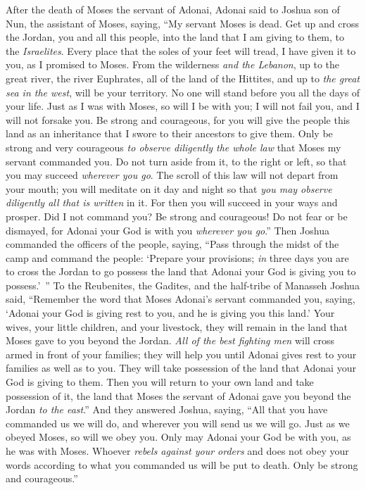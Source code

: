 
\begin{biblechapter} %
 After the death of Moses the servant of Adonai, Adonai said to Joshua son of Nun, the assistant of Moses, saying,
\verse “My servant Moses is dead. Get up and cross the Jordan, you and all this people, into the land that I am giving to them, to the \textit{Israelites}.
\verse Every place that the soles of your feet will tread, I have given it to you, as I promised to Moses.
\verse From the wilderness \textit{and the Lebanon}, up to the great river, the river Euphrates, all of the land of the Hittites, and up to \textit{the great sea in the west}, will be your territory.
\verse No one will stand before you all the days of your life. Just as I was with Moses, so will I be with you; I will not fail you, and I will not forsake you.
\verse Be strong and courageous, for you will give the people this land as an inheritance that I swore to their ancestors to give them.
\verse Only be strong and very courageous \textit{to observe diligently the whole law} that Moses my servant commanded you. Do not turn aside from it, to the right or left, so that you may succeed \textit{wherever you go}.
\verse The scroll of this law will not depart from your mouth; you will meditate on it day and night so that \textit{you may observe diligently all that is written} in it. For then you will succeed in your ways and prosper.
\verse Did I not command you? Be strong and courageous! Do not fear or be dismayed, for Adonai your God is with you \textit{wherever you go}.”
\verse Then Joshua commanded the officers of the people, saying,
\verse “Pass through the midst of the camp and command the people: ‘Prepare your provisions; \textit{in} three days you are to cross the Jordan to go possess the land that Adonai your God is giving you to possess.’ ”
\verse To the Reubenites, the Gadites, and the half-tribe of Manasseh Joshua said,
\verse “Remember the word that Moses Adonai’s servant commanded you, saying, ‘Adonai your God is giving rest to you, and he is giving you this land.’
\verse Your wives, your little children, and your livestock, they will remain in the land that Moses gave to you beyond the Jordan. \textit{All of the best fighting men} will cross armed in front of your families; they will help you
\verse until Adonai gives rest to your families as well as to you. They will take possession of the land that Adonai your God is giving to them. Then you will return to your own land and take possession of it, the land that Moses the servant of Adonai gave you beyond the Jordan \textit{to the east}.”
\verse And they answered Joshua, saying, “All that you have commanded us we will do, and wherever you will send us we will go.
\verse Just as we obeyed Moses, so will we obey you. Only may Adonai your God be with you, as he was with Moses.
\verse Whoever \textit{rebels against your orders} and does not obey your words according to what you commanded us will be put to death. Only be strong and courageous.”
\end{biblechapter}

